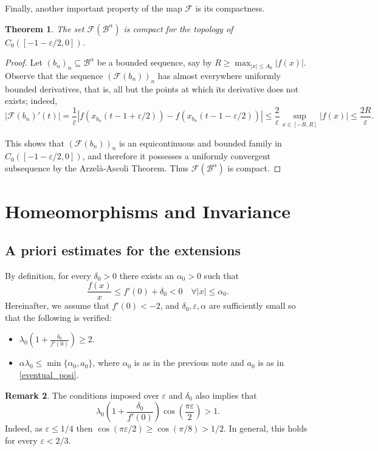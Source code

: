 \documentclass[a4paper,11pt]{article}
\theoremstyle{plain}
\newtheorem{thm}{Theorem}[section]
\theoremstyle{definition}
\newtheorem{remark}[thm]{Remark}
\theoremstyle{definition}
\newcommand{\B}{\mathcal{B}}
\newcommand{\Fcal}{\mathcal{F}}
\numberwithin{equation}{section}
\begin{document}
Finally, another important property of the map $\Fcal$ is its compactness.

\begin{thm}
	The set $\mathcal{F}(\B^\alpha)$ is compact for the topology of $C_0([-1-\varepsilon/2, 0])$.  
\end{thm}
\begin{proof}
Let $(b_n)_n\subseteq \B^{\alpha}$ be a bounded sequence, say by $R\geq \max_{|x|\leq A_0}|f(x)|$. Observe that the sequence $(\Fcal(b_n))_n$ has almost everywhere uniformly bounded derivatives, that is, all but the points at which its derivative does not exists; indeed,
\[
    |\Fcal(b_n)'(t)| = \frac{1}{\varepsilon}| f(x_{b_n}(t-1+\varepsilon/2)) - f(x_{b_n}(t-1-\varepsilon/2)) | \leq \frac{2}{\varepsilon} \sup_{x\in[-R,R]} |f(x)|\leq \frac{2R}{\varepsilon}.
\]

This shows that $(\Fcal(b_n))_n$ is an equicontinuous and bounded family in $C_0([-1-\varepsilon/2,0])$, and therefore it possesses a uniformly convergent subsequence by the Arzelà-Ascoli Theorem.  Thus $\mathcal{F}(\B^\alpha)$ is compact.
\end{proof}

\section{Homeomorphisms and Invariance}\label{sec:Invariance}

\subsection{A priori estimates for the extensions}

By definition, for every $\delta_0>0$ there exists an $\alpha_0>0$ such that
\[
    \frac{f(x)}{x} \leq f'(0) + \delta_0 <0 \quad \forall |x|\leq \alpha_0.
\]
Hereinafter, we assume that $f'(0)<-2$, and $\delta_0,\varepsilon,\alpha$ are sufficiently small so that the following is verified:
\begin{itemize}
    \item $\lambda_0\left( 1+\frac{\delta_0}{f'(0)} \right) \geq 2$.
    \item $\alpha\lambda_0\leq \min\{\alpha_0,a_0\}$, where $\alpha_0$ is as in the previous note and $a_0$ is as in \eqref{eventual_posi}.
\end{itemize}

\begin{remark}
The conditions imposed over $\varepsilon$ and $\delta_0$ also implies that
\[
    \lambda_0\left( 1+\frac{\delta_0}{f'(0)} \right) \cos\left( \frac{\pi\varepsilon}{2} \right)>1.
\]
Indeed, as $\varepsilon\leq 1/4$ then $\cos(\pi\varepsilon/2)\geq \cos(\pi/8)>1/2$. In general, this holds for every $\varepsilon<2/3$.
\end{remark}
\end{document}
